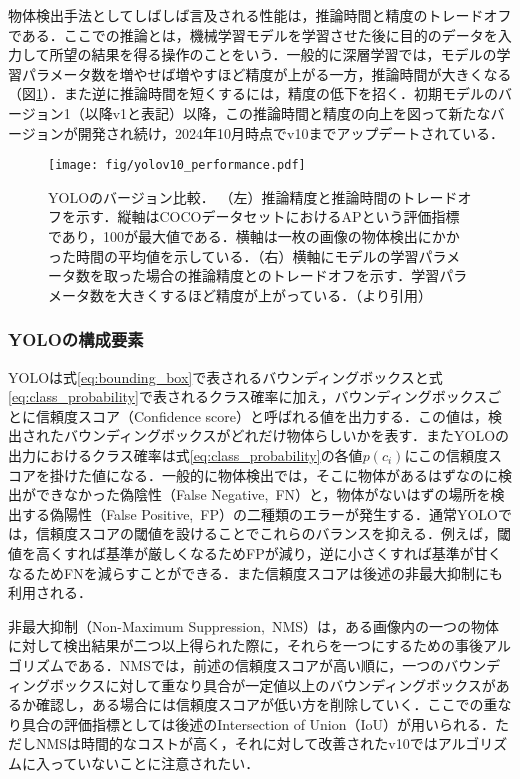     物体検出手法としてしばしば言及される性能は，推論時間と精度のトレードオフである．ここでの推論とは，機械学習モデルを学習させた後に目的のデータを入力して所望の結果を得る操作のことをいう．一般的に深層学習では，モデルの学習パラメータ数を増やせば増やすほど精度が上がる一方，推論時間が大きくなる（図\ref{fig:yolo_tradeoff}）．また逆に推論時間を短くするには，精度の低下を招く．初期モデルのバージョン1（以降v1と表記）以降，この推論時間と精度の向上を図って新たなバージョンが開発され続け，2024年10月時点でv10までアップデートされている．

    \begin{figure}[t]
        \centering
        \texttt{[image: fig/yolov10\_performance.pdf]}
        \caption[YOLOのバージョン比較]{YOLOのバージョン比較．
        （左）推論精度と推論時間のトレードオフを示す．縦軸はCOCOデータセットにおけるAPという評価指標であり，100が最大値である．横軸は一枚の画像の物体検出にかかった時間の平均値を示している．（右）横軸にモデルの学習パラメータ数を取った場合の推論精度とのトレードオフを示す．学習パラメータ数を大きくするほど精度が上がっている．（\cite{wang2024yolov10}より引用）}
        \label{fig:yolo_tradeoff}
    \end{figure}    

        \subsubsection{YOLOの構成要素}
        \label{subsubsec:yolo_components}

        YOLOは式\ref{eq:bounding_box}で表されるバウンディングボックスと式\ref{eq:class_probability}で表されるクラス確率に加え，バウンディングボックスごとに信頼度スコア（Confidence score）と呼ばれる値を出力する．この値は，検出されたバウンディングボックスがどれだけ物体らしいかを表す．またYOLOの出力におけるクラス確率は式\ref{eq:class_probability}の各値$p(c_i)$にこの信頼度スコアを掛けた値になる．一般的に物体検出では，そこに物体があるはずなのに検出ができなかった偽陰性（False Negative,\ FN）と，物体がないはずの場所を検出する偽陽性（False Positive,\ FP）の二種類のエラーが発生する．通常YOLOでは，信頼度スコアの閾値を設けることでこれらのバランスを抑える．例えば，閾値を高くすれば基準が厳しくなるためFPが減り，逆に小さくすれば基準が甘くなるためFNを減らすことができる．また信頼度スコアは後述の非最大抑制にも利用される．

        非最大抑制（Non-Maximum Suppression,\ NMS）は，ある画像内の一つの物体に対して検出結果が二つ以上得られた際に，それらを一つにするための事後アルゴリズムである．NMSでは，前述の信頼度スコアが高い順に，一つのバウンディングボックスに対して重なり具合が一定値以上のバウンディングボックスがあるか確認し，ある場合には信頼度スコアが低い方を削除していく．ここでの重なり具合の評価指標としては後述のIntersection of Union（IoU）が用いられる．ただしNMSは時間的なコストが高く，それに対して改善されたv10ではアルゴリズムに入っていないことに注意されたい．

